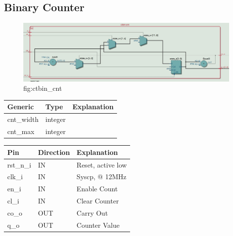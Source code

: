 \documentclass[12pt,a4 paper] {report}
\begin{document}
\subsection{Binary Counter}
\begin{figure}[h]
	\centering	
	\includegraphics[scale=0.2]{../png/ctbin_cnt.png}
	\newline
	fig:ctbin\_cnt\\
\end{figure}
\begin{center}
	\begin{tabular}{| p{2cm} | p{2cm} | p{4cm} |}
		\hline
		Generic & Type & Explanation \\
		\hline
 		cnt\_width & integer & \\
		\hline
		cnt\_max & integer & \\
		\hline
	\end{tabular}	
\end{center}

\begin{center}
	\begin{tabular}{| p{2cm} | p{2cm} | p{4cm} |}
		\hline
		Pin & Direction  & Explanation\\
		\hline	
 		 rst\_n\_i & IN &   Reset, active low\\
 		 \hline
		clk\_i   & IN   & Syscp, @ 12MHz\\
		\hline
		en\_i    & IN  & Enable Count\\
		\hline
		cl\_i    & IN   &Clear Counter\\
		\hline
		co\_o    & OUT & Carry Out\\
		\hline
		q\_o     & OUT  & Counter Value\\
		\hline
		
	\end{tabular}
\end{center}
\newpage
\end{document}
